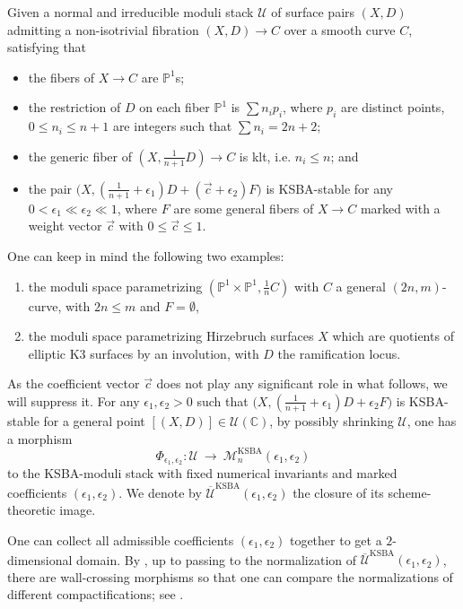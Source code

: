 \documentclass[a4paper,12pt]{amsart}
\newcommand{\ove}[1]{\overline{#1}}
\DeclareMathOperator{\KSBA}{\mathrm{KSBA}}
\newcommand{\bC}{{\mathbb C}}
\newcommand{\bP}{{\mathbb P}}
\newcommand{\cU}{{\mathcal{U}}}
\newcommand\cM{{\mathcal{M}}}
\theoremstyle{definition}
\theoremstyle{remark}
\begin{document}
Given a normal and irreducible moduli stack $\cU$ of surface pairs $(X,D)$ admitting a non-isotrivial fibration $(X,D)\to C$ over a smooth curve $C$, satisfying that
\begin{itemize}
    \item the fibers of $X\to C$ are $\bP^1$s;
    \item the restriction of $D$ on each fiber $\bP^1$ is $\sum n_ip_i$, where $p_i$ are distinct points, $0\leq n_i\leq n+1$ are integers such that $\sum n_i=2n+2$;
    \item\label{point_2} the generic fiber of $(X,\frac{1}{n+1}D)\to C$ is klt, i.e. $n_i\leq n$; and
    \item the pair $\big(X,(\frac{1}{n+1}+\epsilon_1)D + (\vec{c}+\epsilon_2) F\big)$ is KSBA-stable for any $0<\epsilon_1\ll \epsilon_2\ll 1$, where $F$ are some general fibers of $X\to C$ marked with a weight vector $\vec{c}$ with $0\le \vec{c}\le 1$.
\end{itemize}
One can keep in mind the following two examples:
\begin{enumerate}
    \item the moduli space parametrizing $(\bP^1\times\bP^1,\frac{1}{n}C)$ with $C$ a general $(2n,m)$-curve, with $2n\le m$ and $F=\emptyset$,
    \item  the moduli space parametrizing Hirzebruch surfaces $X$ which are quotients of elliptic K3 surfaces by an involution, with $D$ the ramification locus.
\end{enumerate}
As the coefficient vector $\vec{c}$ does not play any significant role in what follows, we will suppress it.
For any $\epsilon_1,\epsilon_2>0$ such that $\big(X,(\frac{1}{n+1}+\epsilon_1)D + \epsilon_2 F\big)$ is KSBA-stable for a general point $[(X,D)]\in \cU(\bC)$, by possibly shrinking $\cU$, one has a morphism $$\Phi_{\epsilon_1,\epsilon_2}\colon \cU \ \longrightarrow \  \cM^{\KSBA}_n(\epsilon_1,\epsilon_2)$$ to the KSBA-moduli stack with fixed numerical invariants and marked coefficients $(\epsilon_1,\epsilon_2)$. We denote by $\ove{\cU}^{\KSBA}(\epsilon_1,\epsilon_2)$ the closure of its scheme-theoretic image.

One can collect all admissible coefficients $(\epsilon_1,\epsilon_2)$ together to get a $2$-dimensional domain. By \cite{ascher2023wall,meng2023mmp}, up to passing to the normalization of $\ove{\cU}^{\KSBA}(\epsilon_1,\epsilon_2)$, there are wall-crossing morphisms so that one can compare the normalizations of different compactifications; see .
\end{document}
